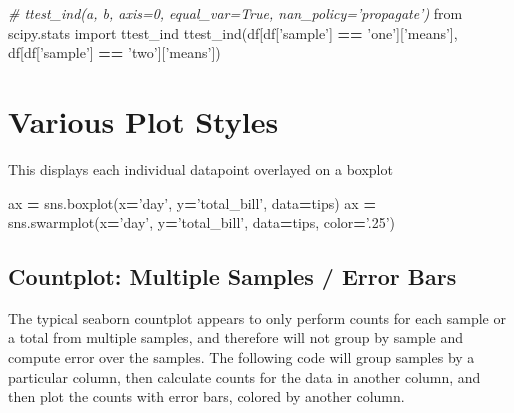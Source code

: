 \documentclass[]{book}
\newenvironment{Shaded}{\begin{snugshade}}{\end{snugshade}}
\newcommand{\CommentTok}[1]{\textcolor[rgb]{0.56,0.35,0.01}{\textit{#1}}}
\newcommand{\ImportTok}[1]{#1}
\newcommand{\NormalTok}[1]{#1}
\newcommand{\OperatorTok}[1]{\textcolor[rgb]{0.81,0.36,0.00}{\textbf{#1}}}
\newcommand{\StringTok}[1]{\textcolor[rgb]{0.31,0.60,0.02}{#1}}
\begin{document}
\begin{Shaded}
\begin{Highlighting}[]
\CommentTok{# ttest_ind(a, b, axis=0, equal_var=True, nan_policy='propagate')}
\ImportTok{from}\NormalTok{ scipy.stats }\ImportTok{import}\NormalTok{ ttest_ind}
\NormalTok{ttest_ind(df[df[}\StringTok{'sample'}\NormalTok{] }\OperatorTok{==} \StringTok{'one'}\NormalTok{][}\StringTok{'means'}\NormalTok{], df[df[}\StringTok{'sample'}\NormalTok{] }\OperatorTok{==} \StringTok{'two'}\NormalTok{][}\StringTok{'means'}\NormalTok{])}
\end{Highlighting}
\end{Shaded}

\hypertarget{various-plot-styles}{%
\section{Various Plot Styles}\label{various-plot-styles}}

This displays each individual datapoint overlayed on a boxplot

\begin{Shaded}
\begin{Highlighting}[]
\NormalTok{ax }\OperatorTok{=}\NormalTok{ sns.boxplot(x}\OperatorTok{=}\StringTok{'day'}\NormalTok{, y}\OperatorTok{=}\StringTok{'total_bill'}\NormalTok{, data}\OperatorTok{=}\NormalTok{tips)}
\NormalTok{ax }\OperatorTok{=}\NormalTok{ sns.swarmplot(x}\OperatorTok{=}\StringTok{'day'}\NormalTok{, y}\OperatorTok{=}\StringTok{'total_bill'}\NormalTok{, data}\OperatorTok{=}\NormalTok{tips, color}\OperatorTok{=}\StringTok{'.25'}\NormalTok{)}
\end{Highlighting}
\end{Shaded}

\hypertarget{countplot-multiple-samples-error-bars}{%
\subsection{Countplot: Multiple Samples / Error Bars}\label{countplot-multiple-samples-error-bars}}

The typical seaborn countplot appears to only perform counts for each sample or a total from multiple samples, and therefore will not group by sample and compute error over the samples. The following code will group samples by a particular column, then calculate counts for the data in another column, and then plot the counts with error bars, colored by another column.
\end{document}
